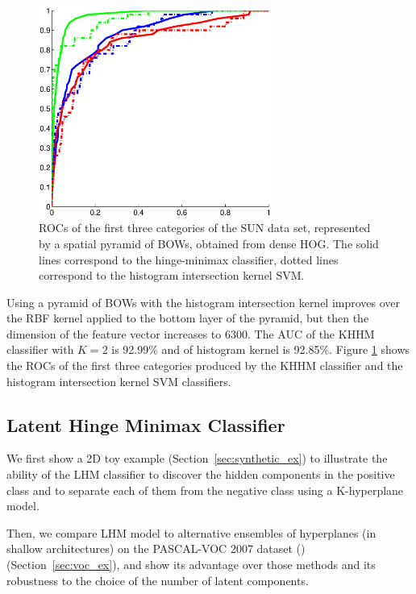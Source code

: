 \documentclass[twoside,11pt]{article}
\begin{document}
\begin{figure}
\center
\includegraphics[width=3in]{combFullD.eps}
\caption {ROCs of the first three categories of the SUN data set, represented by  a spatial pyramid of BOWs, obtained from dense HOG. The solid lines correspond to the hinge-minimax classifier, dotted lines correspond to the histogram intersection kernel SVM.}
\label{SUN_fullD}
\end{figure}

Using a pyramid of BOWs with the histogram intersection kernel improves
over the RBF kernel applied to the bottom layer of the pyramid,
but then the dimension of the feature vector increases to 6300. The AUC  of the KHHM classifier with $K=2$ is 92.99\% and of histogram kernel is 92.85\%. Figure \ref{SUN_fullD} shows the ROCs of the first three categories produced by the KHHM classifier and the histogram intersection kernel SVM classifiers.

\subsection{Latent Hinge Minimax Classifier}\label{sec:exp:LHM}
We first show a 2D toy example (Section~\ref{sec:synthetic_ex}) to illustrate the ability of the LHM classifier to discover the hidden components in the positive class and to separate each of them from the negative class using a K-hyperplane model.

Then, we compare LHM model to alternative ensembles of hyperplanes (in shallow architectures) on the PASCAL-VOC 2007 dataset (\cite{Everingham10}) (Section~\ref{sec:voc_ex}), and show its advantage over those methods and its robustness to the choice of the number of latent components.
\end{document}
